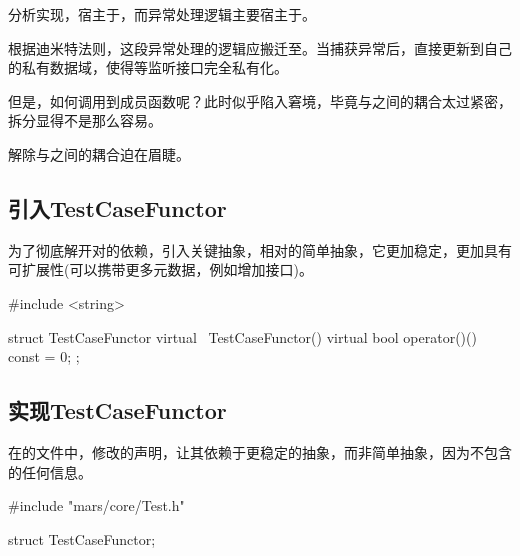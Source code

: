 \begin{content}

分析实现，宿主于，而异常处理逻辑主要宿主于。

根据迪米特法则，这段异常处理的逻辑应搬迁至。当捕获异常后，直接更新到自己的私有数据域，使得等监听接口完全私有化。

但是，如何调用到成员函数呢？此时似乎陷入窘境，毕竟与之间的耦合太过紧密，拆分显得不是那么容易。

解除与之间的耦合迫在眉睫。

\subsection{引入TestCaseFunctor}

为了彻底解开对的依赖，引入关键抽象，相对的简单抽象，它更加稳定，更加具有可扩展性(可以携带更多元数据，例如增加接口)。

\begin{leftbar}
 \begin{c++}[caption={\ttfamily{include/mars/core/internal/TestCaseFunctor.h}}]
#include <string>

struct TestCaseFunctor {
  virtual ~TestCaseFunctor() {}
  virtual bool operator()() const = 0;
};
 \end{c++}
\end{leftbar}

\subsection{实现TestCaseFunctor}

在的文件中，修改的声明，让其依赖于更稳定的抽象，而非简单抽象，因为不包含的任何信息。

\begin{leftbar}
 \begin{c++}[caption={\ttfamily{include/mars/core/TestCase.h}}]
#include "mars/core/Test.h"

struct TestCaseFunctor;


\end{c++}
\end{leftbar}
\end{content}
